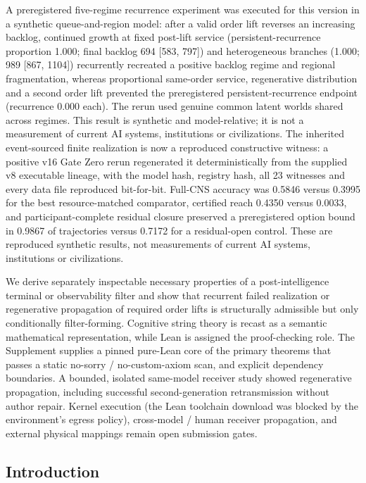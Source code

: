 A preregistered five-regime recurrence experiment was executed for this
version in a synthetic queue-and-region model: after a valid order lift
reverses an increasing backlog, continued growth at fixed post-lift
service (persistent-recurrence proportion 1.000; final backlog 694
{[}583, 797{]}) and heterogeneous branches (1.000; 989 {[}867, 1104{]})
recurrently recreated a positive backlog regime and regional
fragmentation, whereas proportional same-order service, regenerative
distribution and a second order lift prevented the preregistered
persistent-recurrence endpoint (recurrence 0.000 each). The rerun used
genuine common latent worlds shared across regimes. This result is
synthetic and model-relative; it is not a measurement of current AI
systems, institutions or civilizations. The inherited event-sourced
finite realization is now a reproduced constructive witness: a positive
v16 Gate Zero rerun regenerated it deterministically from the supplied
v8 executable lineage, with the model hash, registry hash, all 23
witnesses and every data file reproduced bit-for-bit. Full-CNS accuracy
was 0.5846 versus 0.3995 for the best resource-matched comparator,
certified reach 0.4350 versus 0.0033, and participant-complete residual
closure preserved a preregistered option bound in 0.9867 of trajectories
versus 0.7172 for a residual-open control. These are reproduced
synthetic results, not measurements of current AI systems, institutions
or civilizations.

We derive separately inspectable necessary properties of a
post-intelligence terminal or observability filter and show that
recurrent failed realization or regenerative propagation of required
order lifts is structurally admissible but only conditionally
filter-forming. Cognitive string theory is recast as a semantic
mathematical representation, while Lean is assigned the proof-checking
role. The Supplement supplies a pinned pure-Lean core of the primary
theorems that passes a static no-sorry / no-custom-axiom scan, and
explicit dependency boundaries. A bounded, isolated same-model receiver
study showed regenerative propagation, including successful
second-generation retransmission without author repair. Kernel execution
(the Lean toolchain download was blocked by the environment's egress
policy), cross-model / human receiver propagation, and external physical
mappings remain open submission gates.

\hypertarget{introduction}{%
\subsection{Introduction}\label{introduction}}

